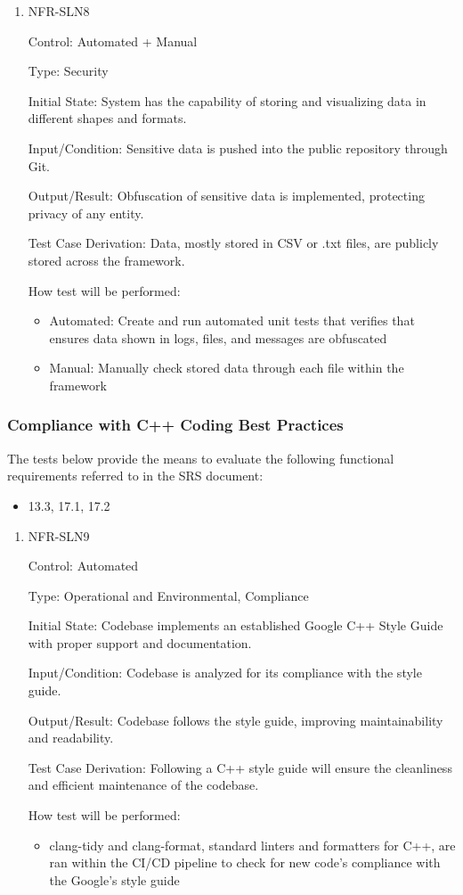 \documentclass[12pt, titlepage]{article}
\begin{document}
\begin{enumerate}
\item NFR-SLN8

Control: Automated + Manual

Type: Security

Initial State: System has the capability of storing and visualizing data in different shapes and formats.

Input/Condition: Sensitive data is pushed into the public repository through Git.

Output/Result: Obfuscation of sensitive data is implemented, protecting privacy of any entity.

Test Case Derivation: Data, mostly stored in CSV or .txt files, are publicly stored across the framework.

How test will be performed:
\begin{itemize}
  \item Automated: Create and run automated unit tests that verifies that ensures data shown in logs, files, and messages are obfuscated
  \item Manual: Manually check stored data through each file within the framework
\end{itemize}

\end{enumerate}

\subsubsection{Compliance with C++ Coding Best Practices}

The tests below provide the means to evaluate the following functional requirements referred to in the SRS document:
\begin{itemize}
  \item 13.3, 17.1, 17.2
\end{itemize}

\begin{enumerate}
\item NFR-SLN9

Control: Automated

Type: Operational and Environmental, Compliance

Initial State: Codebase implements an established Google C++ Style Guide with proper support and documentation.

Input/Condition: Codebase is analyzed for its compliance with the style guide.

Output/Result: Codebase follows the style guide, improving maintainability and readability.

Test Case Derivation: Following a C++ style guide will ensure the cleanliness and efficient maintenance of the codebase.

How test will be performed:
\begin{itemize}
  \item clang-tidy and clang-format, standard linters and formatters for C++, are ran within the CI/CD pipeline to check for new code’s compliance with the Google's style guide
\end{itemize}

\end{enumerate}
\end{document}
